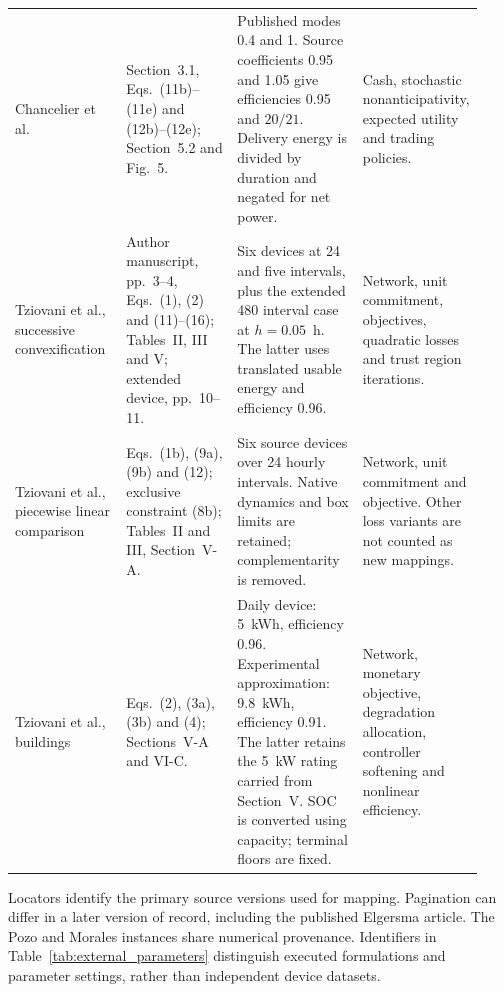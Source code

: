 \begin{landscape}
\begin{longtable}{@{}p{0.16\linewidth}p{0.27\linewidth}p{0.29\linewidth}p{0.21\linewidth}@{}}
Chancelier et al.~\cite{chancelier2026optimal} & Section~3.1, Eqs.~(11b)--(11e) and (12b)--(12e); Section~5.2 and Fig.~5. & Published modes 0.4 and 1. Source coefficients 0.95 and 1.05 give efficiencies 0.95 and $20/21$. Delivery energy is divided by duration and negated for net power. & Cash, stochastic nonanticipativity, expected utility and trading policies.\\
Tziovani et al., successive convexification~\cite{tziovani2023successive} & Author manuscript, pp.~3--4, Eqs.~(1), (2) and (11)--(16); Tables~II, III and V; extended device, pp.~10--11. & Six devices at 24 and five intervals, plus the extended 480 interval case at $h=0.05$~h. The latter uses translated usable energy and efficiency 0.96. & Network, unit commitment, objectives, quadratic losses and trust region iterations.\\
Tziovani et al., piecewise linear comparison~\cite{tziovani2023investigating} & Eqs.~(1b), (9a), (9b) and (12); exclusive constraint (8b); Tables~II and III, Section~V-A. & Six source devices over 24 hourly intervals. Native dynamics and box limits are retained; complementarity is removed. & Network, unit commitment and objective. Other loss variants are not counted as new mappings.\\
Tziovani et al., buildings~\cite{tziovani2025energy} & Eqs.~(2), (3a), (3b) and (4); Sections~V-A and VI-C. & Daily device: 5~kWh, efficiency 0.96. Experimental approximation: 9.8~kWh, efficiency 0.91. The latter retains the 5~kW rating carried from Section~V. SOC is converted using capacity; terminal floors are fixed. & Network, monetary objective, degradation allocation, controller softening and nonlinear efficiency.\\
\end{longtable}
 Locators identify the primary source versions used for mapping. Pagination can differ in a later version of record, including the published Elgersma article. The Pozo and Morales instances share numerical provenance. Identifiers in Table~\ref{tab:external_parameters} distinguish executed formulations and parameter settings, rather than independent device datasets.
\endgroup
\end{landscape}

